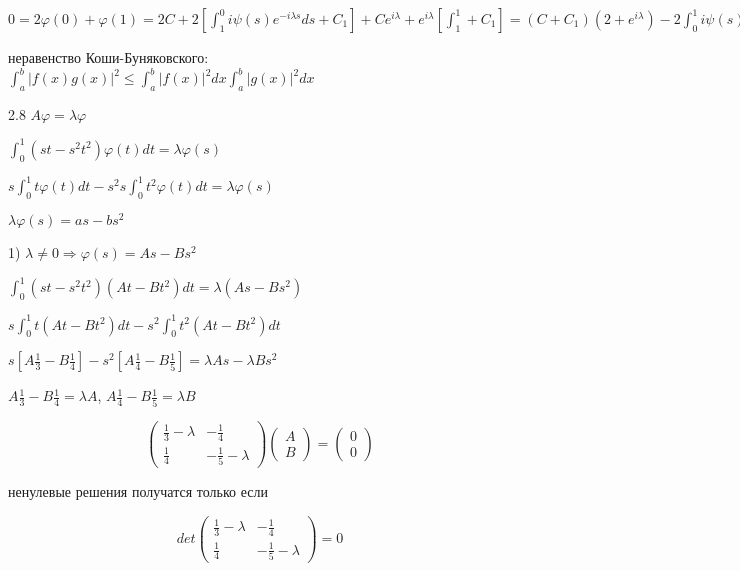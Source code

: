 \documentclass[russian]{article}
\begin{document}
$0 = 2\varphi(0)+\varphi(1) = 2 C + 2 [ \int _1^0 i\psi(s) e ^{-i \lambda s}ds + C_1] + Ce^{i \lambda} + e ^ {i \lambda} [ \int _1^1 + C_1] = (C + C_1)(2+e ^ {i \lambda}) - 2 \int _0^1 i\psi(s) e ^{-i \lambda s}ds \Rightarrow C + C_1 = \frac{2}{2+e ^ {i \lambda}} \int _0^1 i\psi(s) e ^{-i \lambda s}ds \Rightarrow \varphi(t) = e^{i \lambda t} (\frac{2}{2+e ^ {i \lambda}} \int _0^1 i\psi(s) e ^{-i \lambda s}ds + \int _1^t i\psi(s) e ^{-i \lambda s}ds) \Rightarrow \sigma_c = \varnothing$

неравенство Коши-Буняковского: $\int_a^b |f(x) g(x)|^2 \le \int _a^b |f(x)|^2 dx \int _a^b |g(x)|^2dx$

2.8 $A\varphi = \lambda \varphi$

$\int_0^1(s t - s^2 t^2) \varphi (t) dt = \lambda \varphi (s)$

$s\int_0^1t\varphi(t)dt - s^2 s\int_0^1t^2\varphi(t)dt = \lambda \varphi (s)$

$\lambda \varphi(s) = a s - b s^2$

1) $\lambda \ne 0 \Rightarrow \varphi(s) = A s - B s^2$

$\int_0^1(s t - s^2 t^2)(A t - B t^2) dt = \lambda (A s - B s^2)$

$s \int _0^1 t(A t - B t^2) dt - s^2\int_0^1t^2(A t - B t^2) dt$

$s[A \frac{1}{3} - B \frac {1}{4}] - s^2 [A\frac{1}{4} - B\frac{1}{5}] = \lambda A s - \lambda B s ^2$

$A \frac{1}{3} - B \frac {1}{4} = \lambda A$, $A\frac{1}{4} - B\frac{1}{5} = \lambda B$

\begin{equation*}
\begin{pmatrix}
\frac{1}{3}-\lambda & -\frac{1}{4} \\
\frac{1}{4} & -\frac{1}{5}-\lambda
\end{pmatrix} 
\begin{pmatrix}
A \\
B
\end{pmatrix}
=
\begin{pmatrix}
0 \\
0
\end{pmatrix}
\end{equation*}

ненулевые решения получатся только если

$$
det
\begin{pmatrix}
\frac{1}{3}-\lambda & -\frac{1}{4} \\
\frac{1}{4} & -\frac{1}{5}-\lambda
\end{pmatrix} 
=0
$$
\end{document}
